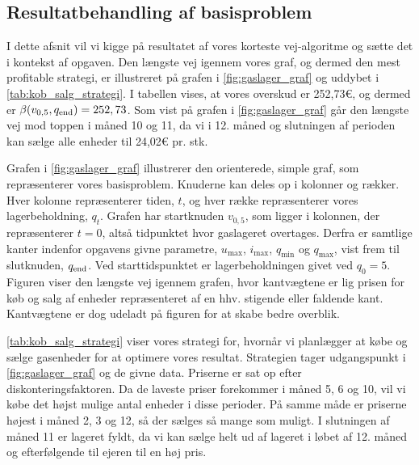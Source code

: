 \subsection{Resultatbehandling af basisproblem}

I dette afsnit vil vi kigge på resultatet af vores korteste vej-algoritme og sætte det i kontekst af opgaven. Den længste vej igennem vores graf, og dermed den mest profitable strategi, er illustreret på grafen i \autoref{fig:gaslager_graf} og uddybet i \autoref{tab:kob_salg_strategi}. I tabellen vises, at vores overskud er 252,73€, og dermed er $\beta (v_{0,5}, q_{\textrm{end}}) = 252,73$. Som vist på grafen i \autoref{fig:gaslager_graf} går den længste vej mod toppen i måned 10 og 11, da vi i 12. måned og slutningen af perioden kan sælge alle enheder til 24,02€ pr. stk. 



Grafen i \autoref{fig:gaslager_graf} illustrerer den orienterede, simple graf, som repræsenterer vores basisproblem. Knuderne kan deles op i kolonner og rækker. Hver kolonne repræsenterer tiden, $t$, og hver række repræsenterer vores lagerbeholdning, $q_t$. Grafen har startknuden $v_{0,5}$, som ligger i kolonnen, der repræsenterer $t=0$, altså tidpunktet hvor gaslageret overtages. Derfra er samtlige kanter indenfor opgavens givne parametre, $u_{\max }$, $i_{\max }$, $q_{\min }$ og $q_{\max }$, vist frem til slutknuden, $q_{\textrm{end}}$. Ved starttidspunktet er lagerbeholdningen givet ved $q_{0}=5$. Figuren viser den længste vej igennem grafen, hvor kantvægtene er lig prisen for køb og salg af enheder repræsenteret af en hhv. stigende eller faldende kant. Kantvægtene er dog udeladt på figuren for at skabe bedre overblik.



\autoref{tab:kob_salg_strategi} viser vores strategi for, hvornår vi planlægger at købe og sælge gasenheder for at optimere vores resultat. Strategien tager udgangspunkt i \autoref{fig:gaslager_graf} og de givne data. Priserne er sat op efter diskonteringsfaktoren.
Da de laveste priser forekommer i måned 5, 6 og 10, vil vi købe det højst mulige antal enheder i disse perioder. På samme måde er priserne højest i måned 2, 3 og 12, så der sælges så mange som muligt. I slutningen af måned 11 er lageret fyldt, da vi kan sælge helt ud af lageret i løbet af 12. måned og efterfølgende til ejeren til en høj pris.
